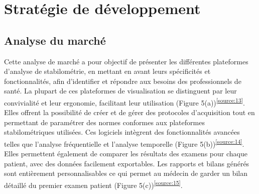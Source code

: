 \section{Stratégie de développement}

\subsection{Analyse du marché}

Cette analyse de marché a pour objectif de présenter les différentes 
plateformes d'analyse de stabilométrie, en mettant en avant leurs spécificités et 
fonctionnalités, afin d’identifier et répondre aux besoins des professionnels de 
santé. 
La plupart de ces plateformes de visualisation se distinguent par leur 
convivialité et leur ergonomie, facilitant leur utilisation (Figure 5(a))\textsuperscript{\ref{source:13}}.  
Elles offrent la possibilité de créer et de gérer des protocoles d’acquisition 
tout en permettant de paramétrer des normes conformes aux plateformes 
stabilométriques utilisées. Ces logiciels intègrent des fonctionnalités avancées 
telles que l’analyse fréquentielle et l’analyse temporelle (Figure 5(b))\textsuperscript{\ref{source:14}}. Elles 
permettent également de comparer les résultats des examens pour chaque patient, 
avec des données facilement exportables. Les rapports et bilans générés sont 
entièrement personnalisables ce qui permet au médecin de garder un bilan détaillé 
du premier examen patient (Figure 5(c))\textsuperscript{\ref{source:15}}.

